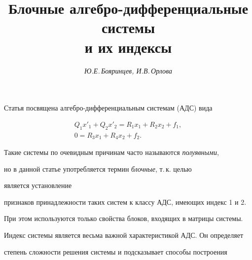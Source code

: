 

 


\author{\it Ю.Е.\,Бояринцев, И.В.\,Орлова} 




\title{Блочные алгебро-дифференциальные системы\\ и их индексы} 


 


\date{} 




\pagestyle{plain} %


 




\maketitle 


\label{begin} 


 


 


Статья посвящена алгебро-дифференциальным системам (АДС) вида 


\begin{gather*} 


Q_1x'_1+Q_2x'_2=R_1x_1+R_2x_2+f_1,\\ 


0=R_3x_1+R_4x_2+f_2. 


\end{gather*} 


Такие системы по очевидным причинам часто называются {\it полуявными}, 


но в данной статье употребляется термин {\it блочные}, т.\,к. целью 


является установление 


признаков принадлежности таких систем к классу АДС, имеющих индекс 1 и 2. 


При этом используются только свойства блоков, входящих в матрицы системы. 


 


Индекс системы является весьма важной характеристикой АДС. Он определяет 


степень сложности решения системы и подсказывает способы построения 


